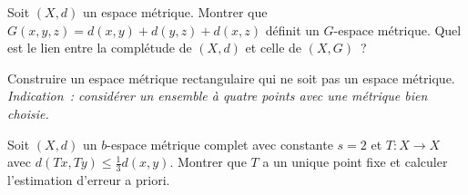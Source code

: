 \begin{exercice}
Soit $(X, d)$ un espace m\'etrique. Montrer que $G(x,y,z) = d(x,y) + d(y,z) + d(x,z)$
d\'efinit un $G$-espace m\'etrique. Quel est le lien entre la compl\'etude de
$(X, d)$ et celle de $(X, G)$~?
\end{exercice}

\begin{exercice}
Construire un espace m\'etrique rectangulaire qui ne soit pas un espace m\'etrique.
\textit{Indication~: consid\'erer un ensemble \`a quatre points avec une
m\'etrique bien choisie.}
\end{exercice}

\begin{exercice}
Soit $(X, d)$ un $b$-espace m\'etrique complet avec constante $s = 2$ et
$T : X \to X$ avec $d(Tx, Ty) \leq \frac{1}{3} d(x,y)$. Montrer que $T$ a un
unique point fixe et calculer l'estimation d'erreur a priori.
\end{exercice}
